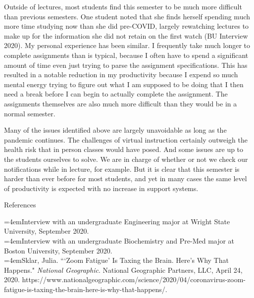 \documentclass[12pt]{article}
\begin{document}
\begin{flushleft}
Outside of lectures, most students find this semester to be much more difficult than previous semesters. One student noted that she finds herself spending much more time studying now than she did pre-COVID, largely rewatching lectures to make up for the information she did not retain on the first watch (BU Interview 2020). My personal experience has been similar. I frequently take much longer to complete assignments than is typical, because I often have to spend a significant amount of time even just trying to parse the assignment specifications. This has resulted in a notable reduction in my productivity because I expend so much mental energy trying to figure out what I am supposed to be doing that I then need a break before I can begin to actually complete the assignment. The assignments themselves are also much more difficult than they would be in a normal semester.

Many of the issues identified above are largely unavoidable as long as the pandemic continues. The challenges of virtual instruction certainly outweigh the health risk that in person classes would have posed. And some issues are up to the students ourselves to solve. We are in charge of whether or not we check our notifications while in lecture, for example. But it is clear that this semester is harder than ever before for most students, and yet in many cases the same level of productivity is expected with no increase in support systems.

\pagebreak
\begin{center}\large References \end{center}
\setlength{\parindent}{0in}
\hangindent=4em{Interview with an undergraduate Engineering major at Wright State University, September 2020.} \\
\hangindent=4em{Interview with an undergraduate Biochemistry and Pre-Med major at Boston University, September 2020.} \\
\hangindent=4em{Sklar, Julia. ```Zoom Fatigue' Is Taxing the Brain. Here's Why That Happens." {\it National Geographic}. National Geographic Partners, LLC, April 24, 2020. https://www.nationalgeographic.com/science/2020/04/coronavirus-zoom-fatigue-is-taxing-the-brain-here-is-why-that-happens/.}

\end{flushleft}
\end{document}
